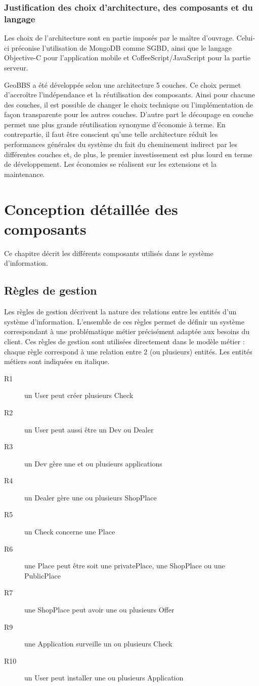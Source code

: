 \documentclass[a4paper,12pt]{report}
\begin{document}
\begin{onehalfspace}
\subsection{Justification des choix d'architecture, des composants et du langage}

  Les choix de l'architecture sont en partie imposés  par le maître d'ouvrage. Celui-ci préconise l'utilisation de MongoDB comme SGBD, ainsi que le langage Objective-C pour l'application mobile et CoffeeScript/JavaScript pour la partie serveur.

  GeoBBS a été développée selon une architecture 5 couches. Ce choix permet d'accroître l'indépendance et la réutilisation des composants. Ainsi pour chacune des couches, il est possible de changer le choix technique ou l'implémentation de façon transparente pour les autres couches. D'autre part le découpage en couche permet une plus grande réutilisation synonyme d'économie à terme. En contrepartie, il faut être conscient qu'une telle architecture réduit les performances générales du système du fait du cheminement indirect par les différentes couches et, de plus, le premier investissement est plus lourd en terme de développement. Les économies se réalisent sur les extensions et la maintenance.

\chapter{Conception détaillée des composants}
Ce chapitre décrit les différents composants utilisés dans le système d’information.
\section{Règles de gestion}

  Les règles de gestion décrivent la nature des relations entre les entités d’un système d’information. L’ensemble de ces règles permet de définir un système correspondant à une problématique métier précisément adaptée aux besoins du client. Ces règles de gestion sont utilisées directement dans le modèle métier : chaque règle correspond à une relation  entre 2 (ou plusieurs) entités. Les entités métiers sont indiquées en italique.

\begin{description}
  \item[R1] un User peut créer plusieurs Check
  \item[R2] un User peut aussi être un Dev ou Dealer
  \item[R3] un Dev gère une et ou plusieurs applications
  \item[R4] un Dealer gère une ou plusieurs ShopPlace
  \item[R5] un Check concerne une Place
  \item[R6] une Place peut être soit une privatePlace, une ShopPlace ou une PublicPlace
  \item[R7] une ShopPlace peut avoir une ou plusieurs Offer
  \item[R9] une Application surveille un ou plusieurs Check
  \item[R10] un User peut installer une ou plusieurs Application
\end{description}


\end{onehalfspace}
\end{document}
